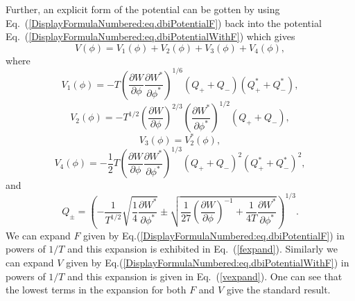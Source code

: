 \documentclass[a4paper,11pt]{article}
\begin{document}
	Further, an explicit form of the potential can be gotten by using
	Eq.~(\ref{DisplayFormulaNumbered:eq.dbiPotentialF}) back into the potential Eq.~(\ref{DisplayFormulaNumbered:eq.dbiPotentialWithF}) which gives
  \begin{equation}\label{DisplayFormulaNumbered:eq.dbiPotential}
    V\left(\phi \right) = V_1\left(\phi \right) + V_2\left(\phi \right) + V_3\left(\phi \right) + V_4\left(\phi \right),
  \end{equation}
  where
	\begin{equation}\label{DisplayFormulaNumbered:eq.dbiPotential}
		V_1\left(\phi \right)
		=-T {\left(\frac{\partial W}{\partial \phi}\frac{\partial W^*}{\partial \phi^*}\right)}^{1/6}\left(Q_{+}+Q_{-}\right)\left(Q_{+}^*+Q_{-}^*\right),
  \end{equation}
  \begin{equation}
    V_2\left(\phi \right)
		=-T^{1/2}{\left(\frac{\partial W}{\partial \phi}\right)}^{2/3}{\left(\frac{\partial W^*}{\partial \phi^*}\right)}^{1/2}\left(Q_+ + Q_-\right),
  \end{equation}
  \begin{equation}
		V_3\left(\phi \right) = V_2^* \left(\phi \right),
  \end{equation}
  \begin{equation}
		V_4\left(\phi \right)
    =-\frac{1}{2}T {\left(\frac{\partial W}{\partial \phi}\frac{\partial W^*}{\partial \phi^*}\right)}^{1/3}\left(Q_+ + Q_-\right)^2 \left(Q_+^* + Q_-^*\right)^2,
	\end{equation}
  and
  \begin{equation}
    Q_\pm = \left(-\frac{1}{T^{1/2}}\sqrt{\frac{1}{4}\frac{\partial W^*}{\partial \phi^*}}\pm\sqrt{\frac{1}{27}{\left(\frac{\partial W}{\partial \phi}\right)}^{-1}+\frac{1}{4T}\frac{\partial W^*}{\partial \phi^*}}\right)^{1/3}.
  \end{equation}
	We can expand $F$ given by  Eq.(\ref{DisplayFormulaNumbered:eq.dbiPotentialF}) 	
in powers of $1/T$ and this expansion is exhibited in Eq.~(\ref{fexpand}). Similarly we can expand $V$ given by 
Eq.(\ref{DisplayFormulaNumbered:eq.dbiPotentialWithF})  in powers of $1/T$ and this
	expansion is given in Eq.~(\ref{vexpand}).
	One can see that the lowest terms in the expansion for both $F$ and $V$ give the standard result.

\end{document}
